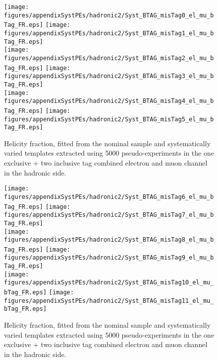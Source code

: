 \begin{figure}[!hb]
\begin{center}
        \texttt{[image: figures/appendixSystPEs/hadronic2/Syst\_BTAG\_misTag0\_el\_mu\_bTag\_FR.eps]}
        \texttt{[image: figures/appendixSystPEs/hadronic2/Syst\_BTAG\_misTag1\_el\_mu\_bTag\_FR.eps]}\\
        \texttt{[image: figures/appendixSystPEs/hadronic2/Syst\_BTAG\_misTag2\_el\_mu\_bTag\_FR.eps]}
        \texttt{[image: figures/appendixSystPEs/hadronic2/Syst\_BTAG\_misTag3\_el\_mu\_bTag\_FR.eps]}\\
        \texttt{[image: figures/appendixSystPEs/hadronic2/Syst\_BTAG\_misTag4\_el\_mu\_bTag\_FR.eps]}
        \texttt{[image: figures/appendixSystPEs/hadronic2/Syst\_BTAG\_misTag5\_el\_mu\_bTag\_FR.eps]}
        
\caption{Helicity fraction, \fr fitted from the nominal \ttbar sample and systematically varied templates extracted using 5000 pseudo-experiments in the one exclusive + two inclusive \bt tag combined electron and muon channel in the hadronic side. }
\label{fig:systematicVar_lep_fR_elmu2incl_btag3_1}
\end{center}
\end{figure}

\begin{figure}[!hb]
\begin{center}
        \texttt{[image: figures/appendixSystPEs/hadronic2/Syst\_BTAG\_misTag6\_el\_mu\_bTag\_FR.eps]}
        \texttt{[image: figures/appendixSystPEs/hadronic2/Syst\_BTAG\_misTag7\_el\_mu\_bTag\_FR.eps]}\\
        \texttt{[image: figures/appendixSystPEs/hadronic2/Syst\_BTAG\_misTag8\_el\_mu\_bTag\_FR.eps]}
        \texttt{[image: figures/appendixSystPEs/hadronic2/Syst\_BTAG\_misTag9\_el\_mu\_bTag\_FR.eps]}\\
        \texttt{[image: figures/appendixSystPEs/hadronic2/Syst\_BTAG\_misTag10\_el\_mu\_bTag\_FR.eps]}
        \texttt{[image: figures/appendixSystPEs/hadronic2/Syst\_BTAG\_misTag11\_el\_mu\_bTag\_FR.eps]}
        
\caption{Helicity fraction, \fr fitted from the nominal \ttbar sample and systematically varied templates extracted using 5000 pseudo-experiments in the one exclusive + two inclusive \bt tag combined electron and muon channel in the hadronic side. }
\label{fig:systematicVar_lep_fR_elmu2incl_btag3_2}
\end{center}
\end{figure}




